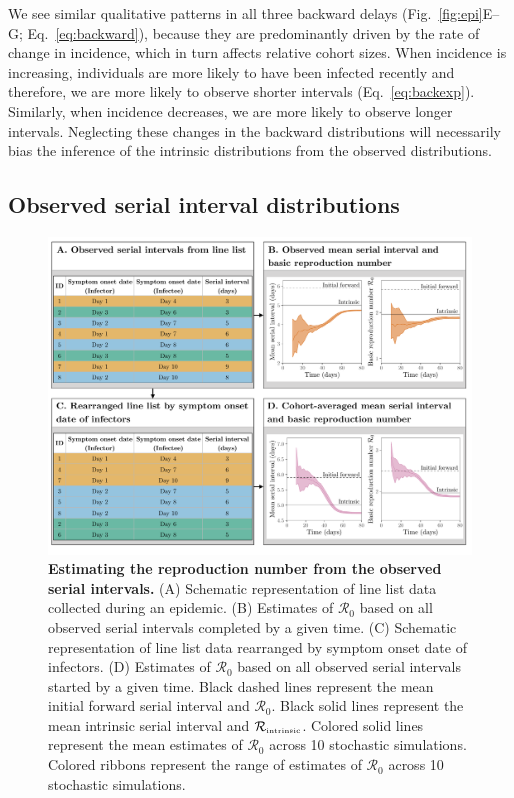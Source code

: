\documentclass[12pt]{article}
\newcommand{\eref}[1]{Eq.~\ref{eq:#1}}
\newcommand{\fref}[1]{Fig.~\ref{fig:#1}}
\newcommand{\Rx}[1]{\ensuremath{{\mathcal R}_{#1}}\xspace}
\newcommand{\Ro}{\Rx{0}}
\newcommand{\Rintrinsic}{\ensuremath{{\mathcal R}_{\textrm{\tiny intrinsic}}}\xspace}
\begin{document}
We see similar qualitative patterns in all three backward delays (\fref{epi}E--G; \eref{backward}), because they are predominantly driven by the rate of change in incidence, which in turn affects relative cohort sizes.
When incidence is increasing, individuals are more likely to have been infected recently and therefore, we are more likely to observe shorter intervals (\eref{backexp}).
Similarly, when incidence decreases, we are more likely to observe longer intervals.
Neglecting these changes in the backward distributions will necessarily bias the inference of the intrinsic distributions from the observed distributions.

\subsection{Observed serial interval distributions}

\begin{figure}[!ht]
\includegraphics[width=\textwidth]{diagram.pdf}
\caption{
\textbf{Estimating the reproduction number from the observed serial intervals.}
(A) Schematic representation of line list data collected during an epidemic.
(B) Estimates of \Ro based on all observed serial intervals completed by a given time.
(C) Schematic representation of line list data rearranged by symptom onset date of infectors.
(D) Estimates of \Ro based on all observed serial intervals started by a given time. 
Black dashed lines represent the mean initial forward serial interval and \Ro.
Black solid lines represent the mean intrinsic serial interval and \Rintrinsic.
Colored solid lines represent the mean estimates of \Ro across 10 stochastic simulations.
Colored ribbons represent the range of estimates of \Ro across 10 stochastic simulations.
}
\label{fig:obsrR}
\end{figure}
\end{document}
